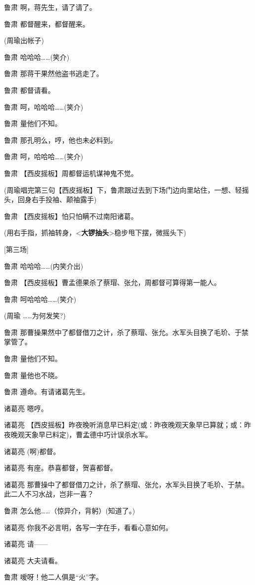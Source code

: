 鲁肃 啊，蒋先生，请了请了。

鲁肃 都督醒来，都督醒来。

(周瑜出帐子)

鲁肃 哈哈哈\ldots{}\ldots{}(笑介)

鲁肃 那蒋干果然他盗书逃走了。

鲁肃 都督请看。

鲁肃 呵，哈哈哈\ldots{}\ldots{}(笑介)

鲁肃 量他们不知。

鲁肃 那孔明么，哼，他也未必料到。

鲁肃 呵，哈哈哈\ldots{}\ldots{}(笑介)

鲁肃 【西皮摇板】周都督运机谋神鬼不觉。

(周瑜唱完第三句【西皮摇板】下，鲁肃跟过去到下场门边向里站住，一想、轻摇头，回身右手投袖、颠袖露手)

鲁肃 【西皮摇板】怕只怕瞒不过南阳诸葛。

(用右手指，抓袖转身，\textless{}\textbf{大锣抽头}\textgreater{}稳步甩下摆，微摇头下)

{[}第三场{]}

鲁肃 哈哈哈\ldots{}\ldots{}(内笑介出)

鲁肃 【西皮摇板】曹孟德果杀了蔡瑁、张允，周都督可算得第一能人。

鲁肃 呵哈哈哈\ldots{}\ldots{}(笑介)

(周瑜 \ldots{}\ldots{}为何发笑?)

鲁肃
那曹操果然中了都督借刀之计，杀了蔡瑁、张允。水军头目换了毛玠、于禁掌管了。

鲁肃 量他们不知。

鲁肃 量他也不晓。

鲁肃 遵命。有请诸葛先生。

诸葛亮 嗯哼。

诸葛亮
【西皮摇板】昨夜晚听消息早已料定(或：昨夜晚观天象早已算就；或：昨夜晚观天象早已料定)，曹孟德中巧计误杀水军。

诸葛亮 (啊)都督。

诸葛亮 有座。恭喜都督，贺喜都督。

诸葛亮
那曹操中了都督借刀之计，杀了蔡瑁、张允，水军头目换了毛玠、于禁。此二人不习水战，岂非一喜？

鲁肃 怎么他\ldots{}\ldots{}（惊异介，背躬）(知道了。)

诸葛亮 你我不必言明，各写一字在手，看看心意如何。

诸葛亮 请------

诸葛亮 大夫请看。

鲁肃 嗳呀！他二人俱是``火''字。

